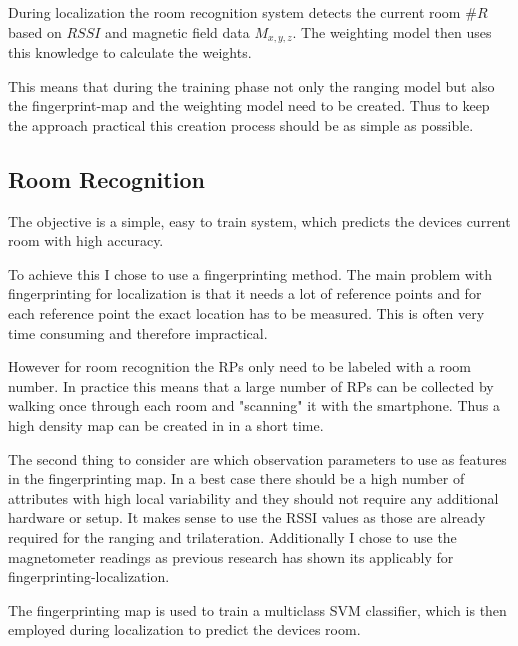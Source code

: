 During localization the room recognition system detects the current room \(\#R\) based on \(RSSI\) and magnetic field data \(M_{x,y,z}\). The weighting model then uses this knowledge to calculate the weights. 

This means that during the training phase not only the ranging model but also the fingerprint-map and the weighting model need to be created. Thus to keep the approach practical this creation process should be as simple as possible.


\subsection{Room Recognition}
The objective is a simple, easy to train system, which predicts the devices current room with high accuracy.

To achieve this I chose to use a fingerprinting method. The main problem with fingerprinting for  localization is that it needs a lot of reference points and for each reference point the exact location has to be measured. This is often very time consuming and therefore impractical.

However for room recognition the RPs only need to be labeled with a room number. In practice this means that a large number of RPs can be collected by walking once through each room and "scanning" it with the smartphone. Thus a high density map can be created in in a short time.

The second thing to consider are which observation parameters to use as features in the fingerprinting map. In a best case there should be a high number of attributes with high local variability and they should not require any additional hardware or setup. It makes sense to use the RSSI values as those are already required for the ranging and trilateration. Additionally I chose to use the magnetometer readings as previous research has shown its applicably for fingerprinting-localization.


The fingerprinting map is used to train a multiclass SVM classifier, which is then employed during localization to predict the devices room.
